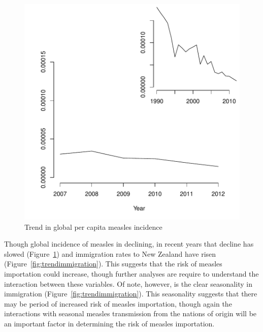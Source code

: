 \documentclass{article}
\begin{document}
\begin{figure}[h!]
\begin{center}
\includegraphics{interimreport1-011}
\end{center}
\caption{Trend in global per capita measles incidence}
\label{fig:trendincidence}
\end{figure}

Though global incidence of measles in declining, in recent years that decline has slowed (Figure~\ref{fig:trendincidence}) and immigration rates to New Zealand have risen (Figure~\ref{fig:trendimmigration}). This suggests that the risk of measles importation could increase, though further analyses are require to understand the interaction between these variables.  Of note, however, is the clear seasonality in immigration (Figure~\ref{fig:trendimmigration}).  This seasonality suggests that there may be period of increased risk of measles importation, though again the interactions with seasonal measles transmission from the nations of origin will be an important factor in determining the risk of measles importation.
\end{document}
